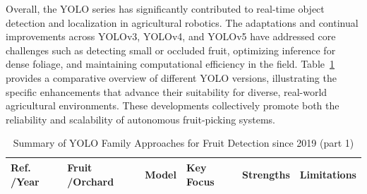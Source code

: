 \documentclass[a4paper,fleqn]{cas-dc}
\begin{document}
Overall, the YOLO series has significantly contributed to real-time object detection and localization in agricultural robotics. The adaptations and continual improvements across YOLOv3, YOLOv4, and YOLOv5 have addressed core challenges such as detecting small or occluded fruit, optimizing inference for dense foliage, and maintaining computational efficiency in the field. Table~\ref{tab:yolo-based} provides a comparative overview of different YOLO versions, illustrating the specific enhancements that advance their suitability for diverse, real-world agricultural environments. These developments collectively promote both the reliability and scalability of autonomous fruit-picking systems.


\begin{table}[htbp]
	\centering
	\footnotesize 
	\caption{Summary of YOLO Family Approaches for Fruit Detection since 2019 (part 1)} 
	\label{tab:yolo-based}
	\begin{tabular}{@{}p{}p{}p{}p{}p{}p{}@{}}
	\toprule
	\textbf{Ref. \newline /Year} & \textbf{Fruit \newline /Orchard} & \textbf{Model} & \textbf{Key Focus} & \textbf{Strengths} & \textbf{Limitations} \\ \midrule
	

\end{tabular}
\end{table}
\end{document}
